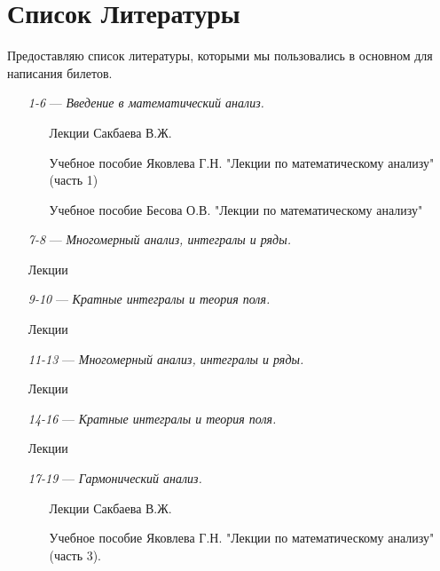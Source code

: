 \chapter{Список Литературы}

Предоставляю список литературы, которыми мы пользовались в основном для написания билетов. 

\begin{itemize}
\item[\textit{1-6}]
\; --- \: \textit{Введение в математический анализ.} 
\begin{itemize}
\item[\textbullet]
Лекции Сакбаева В.Ж.
\item[\textbullet]
Учебное пособие Яковлева Г.Н. "Лекции по математическому анализу" (часть 1)
\item[\textbullet]
Учебное пособие Бесова О.В. "Лекции по математическому анализу"
\end{itemize}

\item[\textit{7-8}] 
\; --- \: \textit{Многомерный анализ, интегралы и ряды.}

Лекции
\item[\textit{9-10}] 
\; --- \: \textit{Кратные интегралы и теория поля.}

Лекции
\item[\textit{11-13}] 
\; --- \: \textit{Многомерный анализ, интегралы и ряды.}

Лекции
\item[\textit{14-16}] 
\; --- \: \textit{Кратные интегралы и теория поля.}

Лекции
\item[\textit{17-19}] 
\; --- \: \textit{Гармонический анализ.}

\begin{itemize}
\item[\textbullet]
Лекции Сакбаева В.Ж.
\item[\textbullet]
Учебное пособие Яковлева Г.Н. "Лекции по математическому анализу"  (часть 3).
\end{itemize}


\end{itemize}
